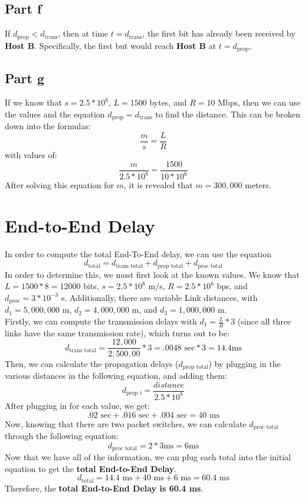\documentclass{article}
\begin{document}
\subsection{Part f}
If $d_{\text{prop}} < d_{\text{trans}}$, then at time $t = d_{\text{trans}}$, the first bit has already been received by \textbf{Host B}. Specifically, the first but would reach \textbf{Host B} at $t = d_{\text{prop}}$.
\subsection{Part g}
If we know that $s = 2.5 * 10^8$, $L = 1500 $ bytes, and $R = 10$ Mbps, then we can use the values and the equation $d_{\text{prop}} = d_{\text{trans}}$ to find the distance. This can be broken down into the formulas:
\[
\frac{m}{s} = \frac{L}{R}
\]
with values of:
\[
\frac{m}{2.5 * 10^8} = \frac{1500}{10 * 10^6}
\]
After solving this equation for $m$, it is revealed that $m = 300,000$ meters.

\setcounter{section}{9}
\section{End-to-End Delay}
In order to compute the total End-To-End delay, we can use the equation
\[
d_{\text{total}} = d_{\text{trans total}} + d_{\text{prop total}} + d_{\text{proc total}} 
\]
In order to determine this, we must first look at the known values. We know that $L = 1500 * 8 = 12000 $ bits, $s = 2.5 * 10^8$ m/s, $R = 2.5 * 10^6$ bps, and $d_{\text{proc}} = 3 * 10^{-3} $ s. Additionally, there are variable Link distances, with $d_{\text{1}} = 5,000,000$ m, $d_{\text{2}} = 4,000,000$ m, and $d_{\text{3}} = 1,000,000$ m. 
\\Firstly, we can compute the transmission delays with $d_{\text{1}} = \frac{L}{R} * 3$ (since all three links have the same transmission rate), which turns out to be:
\[
d_{\text{trans total}} = \frac{12,000}{2,500,00} * 3 = .0048 \text{ sec} * 3 = 14.4 \text{ms}
\]
Then, we can calculate the propagation delays ($d_{\text{prop total}}$) by plugging in the various distances in the following equation, and adding them:
\[
d_{\text{prop i}} = \frac{distance}{2.5 * 10^8} 
\]
After plugging in for each value, we get:
\[
.02 \text{ sec} + .016 \text{ sec} + .004 \text{ sec} = 40 \text{ ms} 
\]
Now, knowing that there are two packet switches, we can calculate $d_{\text{proc total}}$ through the following equation:
\[
d_{\text{proc total}} = 2 * 3 \text{ms} = 6 \text{ms}
\]
Now that we have all of the information, we can plug each total into the initial equation to get the \textbf{total End-to-End Delay}.
\[
d_{\text{total}} = 14.4 \text{ ms} + 40 \text{ ms} + 6 \text{ ms} = 60.4 \text{ ms} 
\]
Therefore, the \textbf{total End-to-End Delay is 60.4 ms}.
\end{document}
